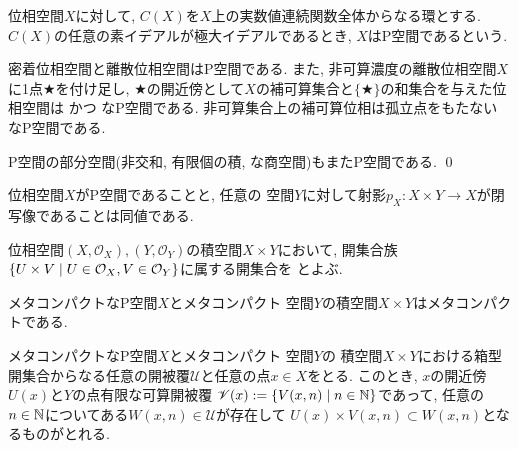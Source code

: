 \documentclass[uplatex, dvipdfmx, a4paper, 12pt, class=jsbook, crop=false]{standalone}
\begin{document}
\begin{proposition}
	位相空間$ X $に対して, $ C(X) $を$ X $上の実数値連続関数全体からなる環とする. 
	$ C(X) $の任意の素イデアルが極大イデアルであるとき, $ X $はP空間であるという.
\end{proposition}

密着位相空間と離散位相空間はP空間である. また, 非可算濃度の離散位相空間$ X $に1点$ \bigstar $を付け足し, 
$ \bigstar $の開近傍として$ X $の補可算集合と$ \{\bigstar\} $の和集合を与えた位相空間は \Hausdorff かつ \Lindelof なP空間である. 
非可算集合上の補可算位相は孤立点をもたない  なP空間である.

\begin{proposition}
	\label{prop: Subspace of a P-space is also a P-space}
	P空間の部分空間(非交和, 有限個の積, な商空間)もまたP空間である.
	\qed
\end{proposition}

\begin{proposition}
	\label{prop: An equivalent condition that a space is a P-space}
	位相空間$ X $がP空間であることと, 
	任意の \Lindelof 空間$ Y $に対して射影$ p_X \colon X \times Y \to X $が閉写像であることは同値である.
\end{proposition}

\begin{definition}
	位相空間$ (X, \mathcal{O}_X), (Y, \mathcal{O}_Y) $の積空間$ X \times Y $において, 
	開集合族$ \setcomp{U \times V}{U \in \mathcal{O}_X, V \in \mathcal{O}_Y} $に属する開集合を
	とよぶ.
\end{definition}

\begin{proposition}
	\label{prop:A product of a MetaCpt P space and a MetaCpt Lindelof space is MetaCpt}
	メタコンパクトなP空間$ X $とメタコンパクト \Lindelof 空間$ Y $の積空間$ X \times Y $はメタコンパクトである.
\end{proposition}

\begin{lemma}
	\label{lemma:Lemma for the statement on the metacompactness of the product space of a MetaCpt P-space and a ParaCpt Lindelof space}	
	メタコンパクトなP空間$ X $とメタコンパクト \Lindelof 空間$ Y $の
	積空間$ X \times Y $における箱型開集合からなる任意の開被覆$ \mathscr{U} $と任意の点$ x \in X $をとる. 
	このとき, $ x $の開近傍$ U(x) $と$ Y $の点有限な可算開被覆
	$ \mathscr{V}(x) \defeq \setcomp{V(x, n)}{n \in \N} $であって, 
	任意の$ n \in \mathbb{N} $についてある$ W(x, n) \in \mathscr{U} $が存在して
	$ U(x) \times V(x, n) \subset W(x, n) $となるものがとれる.
\end{lemma}
\end{document}
